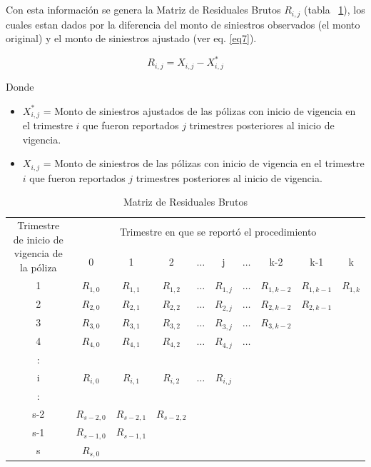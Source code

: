 \documentclass[11pt,twoside,openright,spanish]{report}
\numberwithin{equation}{chapter}
\numberwithin{figure}{chapter}
\numberwithin{table}{chapter}
\begin{document}
	Con esta información se genera la Matriz de Residuales Brutos $R_{i,j}^{}$ (tabla ~\ref{matrix5}), los cuales estan dados por la diferencia del monto de siniestros observados (el monto original) y el monto de siniestros ajustado  (ver eq. \ref{eq7}).
		
	\begin{equation}
	R_{i,j}^{}= X_{i,j}^{} - X_{i,j}^{*} 
	\label{eq7}
	\end{equation}
	
	Donde 
	
	\begin{itemize}
			\setlength\itemsep{-0.5em}
		\item ${X}_{i,j}^{*}$ = Monto de siniestros ajustados de las pólizas con inicio de vigencia en el trimestre $i$ que fueron reportados $j$ trimestres posteriores al inicio de vigencia.
		\item ${X}_{i,j}$ = Monto de siniestros de las pólizas con inicio de vigencia en el trimestre $i$ que fueron reportados $j$ trimestres posteriores al inicio de vigencia.		
		\end{itemize}
		

	\begin{table}[ht]
		\centering
		\begin{tabularx}{\linewidth}{ c|ccccccccc}
			\multirow{2}{4cm}{Trimestre de inicio de vigencia de la póliza}
			& \multicolumn{9}{c}{Trimestre en que se reportó el procedimiento} \\
			& 0  & 1 & 2 & $ \dots $ & j & $\dots $ & k-2 & k-1 &  k \\
			\midrule
			1      &  $R_{1,0}^{ }$ & $R_{1,1}^{ }$ & $R_{1,2}^{ }$ & $ \dots $ & $R_{1,j}^{ }$ & $ \dots $ & $R_{1,k-2}^{ }$ & $R_{1,k-1}^{ }$ & $R_{1,k}^{ }$ \\
			2      &  $R_{2,0}^{ }$ & $R_{2,1}^{ }$ & $R_{2,2}^{ }$ & $ \dots $ & $R_{2,j}^{ }$ & $ \dots $ & $R_{2,k-2}^{ }$ & $R_{2,k-1}^{ }$ & \\
			3      &  $R_{3,0}^{ }$ & $R_{3,1}^{ }$ & $R_{3,2}^{ }$ & $ \dots $ & $R_{3,j}^{ }$ & $ \dots $ & $R_{3,k-2}^{ }$ & & \\
			4      &  $R_{4,0}^{ }$ & $R_{4,1}^{ }$ & $R_{4,2}^{ }$ & $ \dots $ & $R_{4,j}^{ }$ & $ \dots $ & & & \\
			:      & & & & & & & & & \\
			i      &  $R_{i,0}^{ }$ & $R_{i,1}^{ }$ & $R_{i,2}^{ }$ & $ \dots $ & $R_{i,j}^{ }$ & & & & \\
			:      & & & & & & & & & \\
			s-2      &  $R_{s-2,0}^{ }$ & $R_{s-2,1}^{ }$ & $R_{s-2,2}^{ }$ & & & & & & \\
			s-1      &  $R_{s-1,0}^{ }$ & $R_{s-1,1}^{ }$ & & & & & & & \\
			s      &  $R_{s,0}^{ }$ & & & & & & & & \\
		\end{tabularx}
	\caption{Matriz de Residuales Brutos}
	\label{matrix5}
	\end{table}
 
\end{document}

